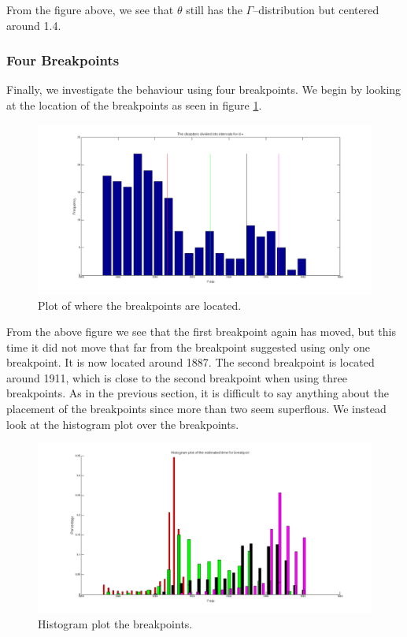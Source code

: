 From the figure above, we see that $\theta$ still has the $\Gamma$--distribution but centered around 1.4.
\newpage
\subsubsection*{Four Breakpoints}

Finally, we investigate the behaviour using four breakpoints. We begin by looking at the location of the breakpoints as seen in figure \ref{fig:bp4}.

\begin{figure}[H]
\centering
\includegraphics[scale=0.26]{./Figures/bp4.png}
\caption{Plot of where the breakpoints are located.}
\label{fig:bp4}
\end{figure}

From the above figure we see that the first breakpoint again has moved, but this time it did not move that far from the breakpoint suggested using only one breakpoint. It is now located around 1887. The second breakpoint is located around 1911, which is close to the second breakpoint when using three breakpoints. As in the previous section, it is difficult to say anything about the placement of the breakpoints since more than two seem superflous. We instead look at the histogram plot over the breakpoints.

\begin{figure}[H]
\centering
\includegraphics[scale=0.26]{./Figures/tpost4.png}
\caption{Histogram plot the breakpoints.}
\label{fig:tpost4}
\end{figure}

